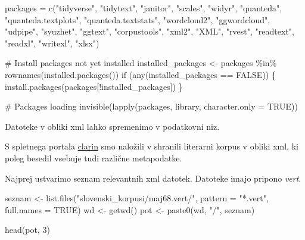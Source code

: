 \documentclass[
  letterpaper,
]{scrbook}
\newenvironment{Shaded}{\begin{snugshade}}{\end{snugshade}}
\newcommand{\AttributeTok}[1]{\textcolor[rgb]{0.40,0.45,0.13}{#1}}
\newcommand{\CommentTok}[1]{\textcolor[rgb]{0.37,0.37,0.37}{#1}}
\newcommand{\ConstantTok}[1]{\textcolor[rgb]{0.56,0.35,0.01}{#1}}
\newcommand{\ControlFlowTok}[1]{\textcolor[rgb]{0.00,0.23,0.31}{#1}}
\newcommand{\DecValTok}[1]{\textcolor[rgb]{0.68,0.00,0.00}{#1}}
\newcommand{\FunctionTok}[1]{\textcolor[rgb]{0.28,0.35,0.67}{#1}}
\newcommand{\NormalTok}[1]{\textcolor[rgb]{0.00,0.23,0.31}{#1}}
\newcommand{\OtherTok}[1]{\textcolor[rgb]{0.00,0.23,0.31}{#1}}
\newcommand{\SpecialCharTok}[1]{\textcolor[rgb]{0.37,0.37,0.37}{#1}}
\newcommand{\StringTok}[1]{\textcolor[rgb]{0.13,0.47,0.30}{#1}}
\begin{document}
\begin{Shaded}
\begin{Highlighting}[]
\NormalTok{packages }\OtherTok{=} \FunctionTok{c}\NormalTok{(}\StringTok{"tidyverse"}\NormalTok{, }\StringTok{"tidytext"}\NormalTok{, }\StringTok{"janitor"}\NormalTok{, }\StringTok{"scales"}\NormalTok{, }\StringTok{"widyr"}\NormalTok{, }
             \StringTok{"quanteda"}\NormalTok{, }\StringTok{"quanteda.textplots"}\NormalTok{, }\StringTok{"quanteda.textstats"}\NormalTok{,}
             \StringTok{"wordcloud2"}\NormalTok{, }\StringTok{"ggwordcloud"}\NormalTok{, }\StringTok{"udpipe"}\NormalTok{, }\StringTok{"syuzhet"}\NormalTok{,}
             \StringTok{"ggtext"}\NormalTok{, }\StringTok{"corpustools"}\NormalTok{, }\StringTok{"xml2"}\NormalTok{, }\StringTok{"XML"}\NormalTok{, }\StringTok{"rvest"}\NormalTok{, }
             \StringTok{"readtext"}\NormalTok{, }\StringTok{"readxl"}\NormalTok{, }\StringTok{"writexl"}\NormalTok{, }\StringTok{"xlsx"}\NormalTok{)}

\CommentTok{\# Install packages not yet installed}
\NormalTok{installed\_packages }\OtherTok{\textless{}{-}}\NormalTok{ packages }\SpecialCharTok{\%in\%} \FunctionTok{rownames}\NormalTok{(}\FunctionTok{installed.packages}\NormalTok{())}
\ControlFlowTok{if}\NormalTok{ (}\FunctionTok{any}\NormalTok{(installed\_packages }\SpecialCharTok{==} \ConstantTok{FALSE}\NormalTok{)) \{}
  \FunctionTok{install.packages}\NormalTok{(packages[}\SpecialCharTok{!}\NormalTok{installed\_packages])}
\NormalTok{\}}

\CommentTok{\# Packages loading}
\FunctionTok{invisible}\NormalTok{(}\FunctionTok{lapply}\NormalTok{(packages, library, }\AttributeTok{character.only =} \ConstantTok{TRUE}\NormalTok{))}
\end{Highlighting}
\end{Shaded}

Datoteke v obliki xml lahko spremenimo v podatkovni niz.

S spletnega portala
\href{https://www.clarin.si/repository/xmlui/handle/11356/1491}{clarin}
smo naložili v shranili literarni korpus v obliki xml, ki poleg besedil
vsebuje tudi različne metapodatke.

Najprej ustvarimo seznam relevantnih xml datotek. Datoteke imajo pripono
\emph{vert}.

\begin{Shaded}
\begin{Highlighting}[]
\NormalTok{seznam }\OtherTok{\textless{}{-}} \FunctionTok{list.files}\NormalTok{(}\StringTok{"slovenski\_korpusi/maj68.vert/"}\NormalTok{,}
                     \AttributeTok{pattern =} \StringTok{"*.vert"}\NormalTok{,}
                     \AttributeTok{full.names =} \ConstantTok{TRUE}\NormalTok{)}
\NormalTok{wd }\OtherTok{\textless{}{-}} \FunctionTok{getwd}\NormalTok{()}
\NormalTok{pot }\OtherTok{\textless{}{-}} \FunctionTok{paste0}\NormalTok{(wd, }\StringTok{"/"}\NormalTok{, seznam)}

\FunctionTok{head}\NormalTok{(pot, }\DecValTok{3}\NormalTok{)}
\end{Highlighting}
\end{Shaded}
\end{document}

